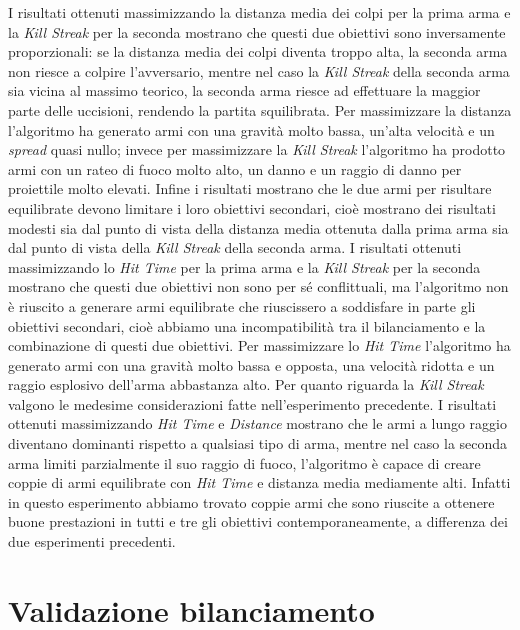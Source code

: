 \documentclass[12pt, italian]{toptesi}
\begin{document}
I risultati ottenuti massimizzando la distanza media dei colpi per la prima arma e la \emph{Kill Streak} per la seconda mostrano che questi due obiettivi sono inversamente proporzionali: se la distanza media dei colpi diventa troppo alta, la seconda arma non riesce a colpire l'avversario, mentre nel caso la \emph{Kill Streak} della seconda arma sia vicina al massimo teorico, la seconda arma riesce ad effettuare la maggior parte delle uccisioni, rendendo la partita squilibrata. Per massimizzare la distanza l'algoritmo ha generato armi con una gravità molto bassa, un'alta velocità e un \emph{spread} quasi nullo; invece per massimizzare la \emph{Kill Streak} l'algoritmo ha prodotto armi con un rateo di fuoco molto alto, un danno e un raggio di danno per proiettile molto elevati. Infine i risultati mostrano che le due armi per risultare equilibrate devono limitare i loro obiettivi secondari, cioè mostrano dei risultati modesti sia dal punto di vista della distanza media ottenuta dalla prima arma sia dal punto di vista della \emph{Kill Streak} della seconda arma.
I risultati ottenuti massimizzando lo \emph{Hit Time} per la prima arma e la \emph{Kill Streak} per la seconda mostrano che questi due obiettivi non sono per sé conflittuali, ma l'algoritmo non è riuscito a generare armi equilibrate che riuscissero a soddisfare in parte gli obiettivi secondari, cioè abbiamo una incompatibilità tra il bilanciamento e la combinazione di questi due obiettivi.
Per massimizzare lo \emph{Hit Time} l'algoritmo ha generato armi con una gravità molto bassa e opposta, una velocità ridotta e un raggio esplosivo dell'arma abbastanza alto. Per quanto riguarda la \emph{Kill Streak} valgono le medesime considerazioni fatte nell'esperimento precedente.
I risultati ottenuti massimizzando \emph{Hit Time} e \emph{Distance} mostrano che le armi a lungo raggio diventano dominanti rispetto a qualsiasi tipo di arma, mentre nel caso la seconda arma limiti parzialmente il suo raggio di fuoco, l'algoritmo è capace di creare coppie di armi equilibrate con \emph{Hit Time} e distanza media mediamente alti. Infatti in questo esperimento abbiamo trovato coppie armi che sono riuscite a ottenere buone prestazioni in tutti e tre gli obiettivi contemporaneamente, a differenza dei due esperimenti precedenti.

\section{Validazione bilanciamento}
\end{document}
